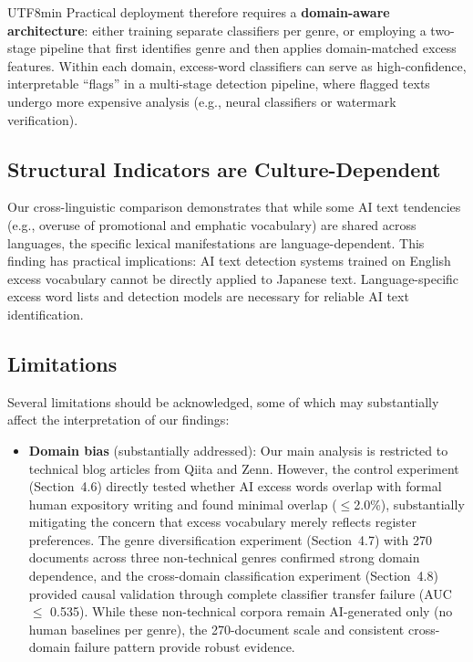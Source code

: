 \documentclass[11pt,a4paper]{article}
\begin{document}
\begin{CJK}{UTF8}{min}
Practical deployment therefore requires a \textbf{domain-aware architecture}: either training separate classifiers per genre, or employing a two-stage pipeline that first identifies genre and then applies domain-matched excess features. Within each domain, excess-word classifiers can serve as high-confidence, interpretable ``flags'' in a multi-stage detection pipeline, where flagged texts undergo more expensive analysis (e.g., neural classifiers or watermark verification).

\subsection{Structural Indicators are Culture-Dependent}

Our cross-linguistic comparison demonstrates that while some AI text tendencies (e.g., overuse of promotional and emphatic vocabulary) are shared across languages, the specific lexical manifestations are language-dependent. This finding has practical implications: AI text detection systems trained on English excess vocabulary cannot be directly applied to Japanese text. Language-specific excess word lists and detection models are necessary for reliable AI text identification.

\subsection{Limitations}

Several limitations should be acknowledged, some of which may substantially affect the interpretation of our findings:

\begin{itemize}
    \item \textbf{Domain bias} (substantially addressed): Our main analysis is restricted to technical blog articles from Qiita and Zenn. However, the control experiment (Section~4.6) directly tested whether AI excess words overlap with formal human expository writing and found minimal overlap ($\leq$2.0\%), substantially mitigating the concern that excess vocabulary merely reflects register preferences. The genre diversification experiment (Section~4.7) with 270 documents across three non-technical genres confirmed strong domain dependence, and the cross-domain classification experiment (Section~4.8) provided causal validation through complete classifier transfer failure (AUC $\leq$ 0.535). While these non-technical corpora remain AI-generated only (no human baselines per genre), the 270-document scale and consistent cross-domain failure pattern provide robust evidence.


\end{itemize}
\end{CJK}
\end{document}
